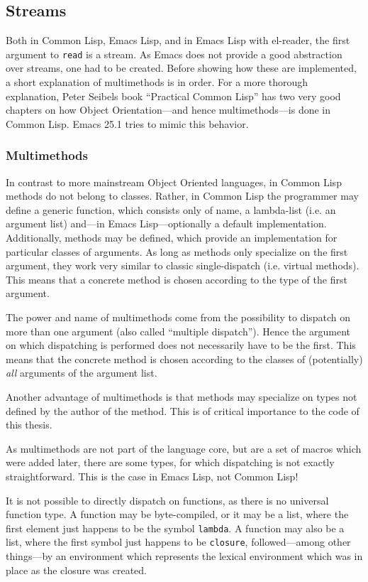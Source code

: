 \documentclass[a4paper,10pt,twoside]{report}
\newcommand{\el}{Emacs Lisp}
\newcommand{\cl}{Common Lisp}
\newcommand{\elr}{el-reader}
\newcommand{\sym}[1]{\texttt{#1}}
\newcommand{\fun}[1]{\texttt{#1}}
\newcommand{\Read}{\fun{read}}
\begin{document}
\subsection{Streams}
\label{subsec:streams}

Both in \cl{}, \el{}, and in \el{} with \elr{}, the first argument to \Read{} is
a stream.  As Emacs does not provide a good abstraction over streams, one had to
be created.  Before showing how these are implemented, a short explanation of
multimethods is in order.  For a more thorough explanation, Peter Seibels book
``Practical Common Lisp'' has two very good chapters on how Object
Orientation---and hence multimethods---is done in \cl{}.\cite{pcl} Emacs 25.1
tries to mimic this behavior.

\subsubsection{Multimethods}
\label{subsubsec:multimethods}

In contrast to more mainstream Object Oriented languages, in \cl{} methods do
not belong to classes.  Rather, in \cl{} the programmer may define a generic
function, which consists only of name, a lambda-list (i.e. an argument list)
and---in \el{}---optionally a default implementation.  Additionally, methods may
be defined, which provide an implementation for particular classes of arguments.
As long as methods only specialize on the first argument, they work very similar
to classic single-dispatch (i.e. virtual methods).  This means that a concrete
method is chosen according to the type of the first argument.

The power and name of multimethods come from the possibility to dispatch on more
than one argument (also called ``multiple dispatch'').  Hence the argument on
which dispatching is performed does not necessarily have to be the first.  This
means that the concrete method is chosen according to the classes of
(potentially) \emph{all} arguments of the argument list.

Another advantage of multimethods is that methods may specialize on types not
defined by the author of the method.  This is of critical importance to the code
of this thesis.

As multimethods are not part of the language core, but are a set of macros which
were added later, there are some types, for which dispatching is not exactly
straightforward.  This is the case in \el{}, not \cl{}!

It is not possible to directly dispatch on functions, as there is no universal
function type.  A function may be byte-compiled, or it may be a list, where the
first element just happens to be the symbol \sym{lambda}.  A function may also
be a list, where the first symbol just happens to be \sym{closure},
followed---among other things---by an environment which represents the lexical
environment which was in place as the closure was created.
\end{document}
